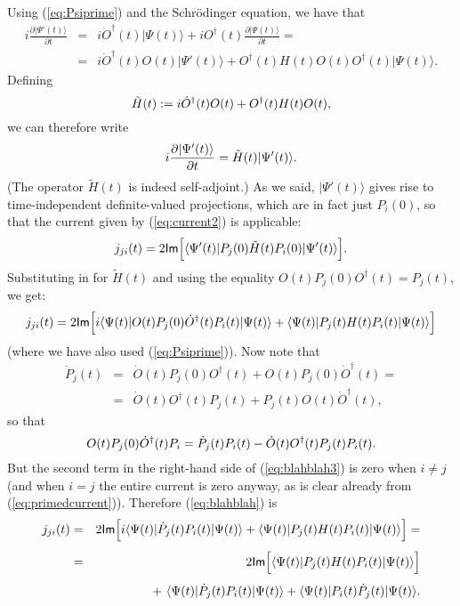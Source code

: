 \documentclass[12pt]{article}
\newcommand{\be}{\vspace*{6pt} \begin{equation}}
\newcommand{\ee}{\vspace*{10pt} \end{equation}}
\renewcommand{\Im}{\mbox{{\sf Im}}}                             %
\newcommand{\bra}[1]{\langle #1\vert}                           %
\newcommand{\ket}[1]{\vert #1\rangle}                           %
\begin{document}
Using (\ref{eq:Psiprime}) and the Schr\"odinger equation, we have that
\begin{eqnarray}
  {\displaystyle i \frac{\partial \ket{\Psi'(t)}}{\partial t} } & = &
  {\displaystyle
   i \dot{O}^{\dagger}(t) \ket{\Psi(t)} + i O^{\dagger}(t) 
   \frac{\partial \ket{\Psi(t)}}{\partial t}= } \nonumber  \\[1ex]
   \ & = &
  {\displaystyle  i \dot{O}^{\dagger}(t) O(t) \ket{\Psi'(t)} +
  O^{\dagger}(t) H(t) O(t) O^{\dagger}(t) \ket{\Psi(t)}.}
\end{eqnarray}
Defining
\be
  \tilde{H}(t) := i\dot{O}^{\dagger}(t) O(t) + O^{\dagger}(t) 
  H(t) O(t),
  \label{eq:effective}
\ee
we can therefore write
\be
  \label{eq:primedschr}
  i \frac{\partial \ket{\Psi'(t)}}{\partial t} = \tilde{H}(t) 
  \ket{\Psi'(t)}.
\ee
(The operator $\tilde{H}(t)$ is indeed self-adjoint.) As we said, 
$\ket{\Psi'(t)}$ gives rise to time-independent definite-valued 
projections, which are in fact just $P_i(0)$, so that the current 
given by (\ref{eq:current2}) is applicable:
\be
  \label{eq:primedcurrent}
  j_{ji}(t) = 2 \Im \Big[ \bra{\Psi'(t)} P_j(0) \tilde{H}(t) P_i(0)
  \ket{\Psi'(t)} \Big].
\ee
Substituting in for $\tilde{H}(t)$ and using the equality
$O(t)P_j(0)O^{\dagger}(t) = P_j(t)$, we get:
\be
  \label{eq:blahblah}
  j_{ji}(t) = 2 \Im \Big[ i\bra{\Psi(t)} O(t) P_j(0) 
  \dot{O}^{\dagger}(t) P_i(t) \ket{\Psi(t)} + \bra{\Psi(t)} P_j(t) 
  H(t) P_i(t) \ket{\Psi(t)} \Big]
\ee
(where we have also used (\ref{eq:Psiprime})).  Now note that
\begin{eqnarray}
  \dot{P}_j(t) & = & \dot{O}(t) P_j(0) O^{\dagger}(t) + O(t) P_j(0)
  \dot{O}^{\dagger}(t)= \nonumber \\[1ex]
  \ & = &
  \dot{O}(t)O^{\dagger}(t) P_j(t) + P_j(t) O(t) \dot{O}^{\dagger}(t),
  \label{eq:blahblah2}
\end{eqnarray}
so that
\be
  \label{eq:blahblah3}
  O(t)P_j(0) \dot{O}^{\dagger}(t)P_i = \dot{P}_j(t)P_i(t) -
  \dot{O}(t)O^{\dagger}(t)P_j(t)P_i(t).
\ee
But the second term in the right-hand side of (\ref{eq:blahblah3}) is
zero when $i \neq j$ (and when $i = j$ the entire current is zero
anyway, as is clear already from (\ref{eq:primedcurrent})). Therefore
(\ref{eq:blahblah}) is
\begin{eqnarray}
  j_{ji}(t) & = &
  2 \Im \Big[ i\bra{\Psi(t)} \dot{P}_j(t) P_i(t) \ket{\Psi(t)}
  + \bra{\Psi(t)} P_j(t) H(t) P_i(t) \ket{\Psi(t)} \Big]= \nonumber 
  \\[1ex] \ & = &
  2 \Im \Big[ \bra{\Psi(t)} P_j(t) H(t) P_i(t) \ket{\Psi(t)} \Big]
  \nonumber  \\[1ex]
  \ &  &  \ \ \
  + \ \bra{\Psi(t)}\dot{P}_j(t)P_i(t)\ket{\Psi(t)}
  + \bra{\Psi(t)}P_i(t)\dot{P}_j(t)\ket{\Psi(t)}.
  \label{eq:blahblah4}
\end{eqnarray}
\end{document}
